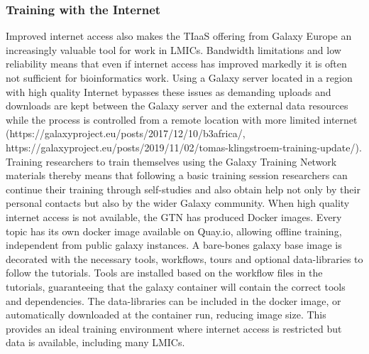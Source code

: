 \documentclass[10pt,letterpaper]{article}
\begin{document}
\subsubsection*{Training with the Internet}
Improved internet access also makes the TIaaS offering from Galaxy Europe an increasingly valuable tool for work in LMICs.
Bandwidth limitations and low reliability means that even if internet access has improved markedly it is often not sufficient for bioinformatics work.
Using a Galaxy server located in a region with high quality Internet bypasses these issues as demanding uploads and downloads are kept between the Galaxy server and the external data resources while the process is controlled from a remote location with more limited internet (https://galaxyproject.eu/posts/2017/12/10/b3africa/, https://galaxyproject.eu/posts/2019/11/02/tomas-klingstroem-training-update/).
Training researchers to train themselves using the Galaxy Training Network materials thereby means that following a basic training session researchers can continue their training through self-studies and also obtain help not only by their personal contacts but also by the wider Galaxy community.
When high quality internet access is not available, the GTN has produced Docker images.
Every topic has its own docker image available on Quay.io, allowing offline training, independent from public galaxy instances. A bare-bones galaxy base image is decorated with the necessary tools, workflows, tours and optional data-libraries to follow the tutorials.
Tools are installed based on the workflow files in the tutorials, guaranteeing that the galaxy container will contain the correct tools and dependencies.
The data-libraries can be included in the docker image, or automatically downloaded at the container run, reducing image size.
This provides an ideal training environment where internet access is restricted but data is available, including many LMICs.
\end{document}

